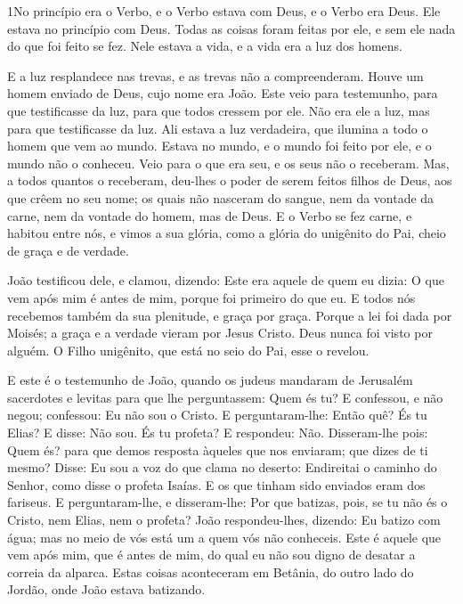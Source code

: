 
\lettrine{1} No princípio era o Verbo, e o Verbo estava com
Deus, e o Verbo era Deus. Ele estava no princípio com Deus.
Todas as coisas foram feitas por ele, e sem ele nada do que foi
feito se fez. Nele estava a vida, e a vida era a luz dos homens.

E a luz resplandece nas trevas, e as trevas não a compreenderam.
Houve um homem enviado de Deus, cujo nome era João. Este
veio para testemunho, para que testificasse da luz, para que todos
cressem por ele. Não era ele a luz, mas para que testificasse da
luz. Ali estava a luz verdadeira, que ilumina a todo o homem que
vem ao mundo. Estava no mundo, e o mundo foi feito por ele, e
o mundo não o conheceu. Veio para o que era seu, e os seus
não o receberam. Mas, a todos quantos o receberam, deu-lhes o
poder de serem feitos filhos de Deus, aos que crêem no seu nome;
os quais não nasceram do sangue, nem da vontade da carne, nem
da vontade do homem, mas de Deus. E o Verbo se fez carne, e
habitou entre nós, e vimos a sua glória, como a glória do unigênito
do Pai, cheio de graça e de verdade.

João testificou dele, e clamou, dizendo: Este era aquele de quem
eu dizia: O que vem após mim é antes de mim, porque foi primeiro do
que eu. E todos nós recebemos também da sua plenitude, e
graça por graça. Porque a lei foi dada por Moisés; a graça e
a verdade vieram por Jesus Cristo. Deus nunca foi visto por
alguém. O Filho unigênito, que está no seio do Pai, esse o revelou.

E este é o testemunho de João, quando os judeus mandaram de
Jerusalém sacerdotes e levitas para que lhe perguntassem: Quem és
tu? E confessou, e não negou; confessou: Eu não sou o Cristo.
E perguntaram-lhe: Então quê? És tu Elias? E disse: Não sou.
És tu profeta? E respondeu: Não. Disseram-lhe pois: Quem és?
para que demos resposta àqueles que nos enviaram; que dizes de ti
mesmo? Disse: Eu sou a voz do que clama no deserto:
Endireitai o caminho do Senhor, como disse o profeta Isaías.
E os que tinham sido enviados eram dos fariseus. E
perguntaram-lhe, e disseram-lhe: Por que batizas, pois, se tu não és
o Cristo, nem Elias, nem o profeta? João respondeu-lhes,
dizendo: Eu batizo com água; mas no meio de vós está um a quem vós
não conheceis. Este é aquele que vem após mim, que é antes de
mim, do qual eu não sou digno de desatar a correia da alparca.
Estas coisas aconteceram em Betânia, do outro lado do Jordão,
onde João estava batizando.

